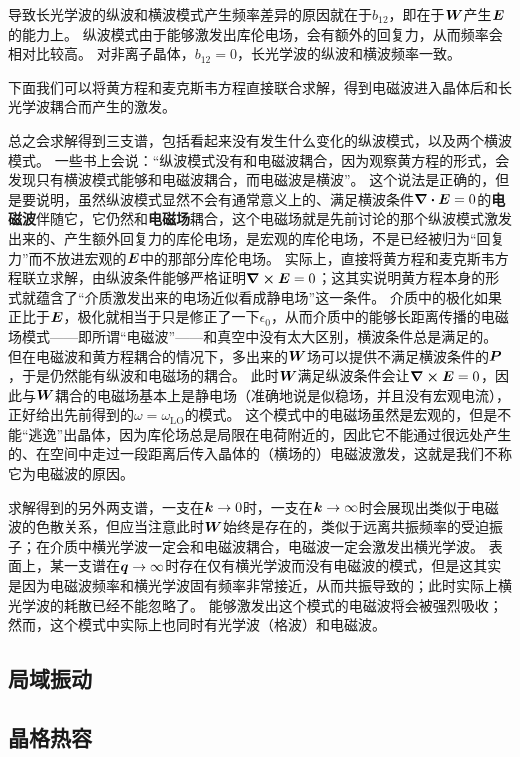 \documentclass[hyperref, UTF8, a4paper]{ctexart}
\renewcommand{\emph}[1]{\textbf{#1}}
\begin{document}
导致长光学波的纵波和横波模式产生频率差异的原因就在于$b_{12}$，即在于$\vb*{W}$产生$\vb*{E}$的能力上。
纵波模式由于能够激发出库伦电场，会有额外的回复力，从而频率会相对比较高。
对非离子晶体，$b_{12}=0$，长光学波的纵波和横波频率一致。

下面我们可以将黄方程和麦克斯韦方程直接联合求解，得到电磁波进入晶体后和长光学波耦合而产生的激发。

总之会求解得到三支谱，包括看起来没有发生什么变化的纵波模式，以及两个横波模式。
一些书上会说：“纵波模式没有和电磁波耦合，因为观察黄方程的形式，会发现只有横波模式能够和电磁波耦合，而电磁波是横波”。
这个说法是正确的，但是要说明，虽然纵波模式显然不会有通常意义上的、满足横波条件$\div{\vb*{E}}=0$的\emph{电磁波}伴随它，它仍然和\emph{电磁场}耦合，这个电磁场就是先前讨论的那个纵波模式激发出来的、产生额外回复力的库伦电场，是宏观的库伦电场，不是已经被归为“回复力”而不放进宏观的$\vb*{E}$中的那部分库伦电场。
实际上，直接将黄方程和麦克斯韦方程联立求解，由纵波条件能够严格证明$\curl{\vb*{E}}=0$；这其实说明黄方程本身的形式就蕴含了“介质激发出来的电场近似看成静电场”这一条件。
介质中的极化如果正比于$\vb*{E}$，极化就相当于只是修正了一下$\epsilon_0$，从而介质中的能够长距离传播的电磁场模式——即所谓“电磁波”——和真空中没有太大区别，横波条件总是满足的。
但在电磁波和黄方程耦合的情况下，多出来的$\vb*{W}$场可以提供不满足横波条件的$\vb*{P}$，于是仍然能有纵波和电磁场的耦合。
此时$\vb*{W}$满足纵波条件会让$\curl{\vb*{E}}=0$，因此与$\vb*{W}$耦合的电磁场基本上是静电场（准确地说是似稳场，并且没有宏观电流），正好给出先前得到的$\omega=\omega_\text{LO}$的模式。
这个模式中的电磁场虽然是宏观的，但是不能“逃逸”出晶体，因为库伦场总是局限在电荷附近的，因此它不能通过很远处产生的、在空间中走过一段距离后传入晶体的（横场的）电磁波激发，这就是我们不称它为电磁波的原因。

求解得到的另外两支谱，一支在$\vb*{k} \to 0$时，一支在$\vb*{k} \to \infty$时会展现出类似于电磁波的色散关系，但应当注意此时$\vb*{W}$始终是存在的，类似于远离共振频率的受迫振子；在介质中横光学波一定会和电磁波耦合，电磁波一定会激发出横光学波。
表面上，某一支谱在$\vb*{q} \to \infty$时存在仅有横光学波而没有电磁波的模式，但是这其实是因为电磁波频率和横光学波固有频率非常接近，从而共振导致的；此时实际上横光学波的耗散已经不能忽略了。
能够激发出这个模式的电磁波将会被强烈吸收；然而，这个模式中实际上也同时有光学波（格波）和电磁波。

\subsection{局域振动}

\subsection{晶格热容}
\end{document}
